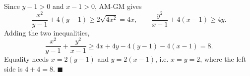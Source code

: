 Since $y-1>0$ and $x-1>0$, AM-GM gives
\[\dfrac{x^2}{y-1}+4(y-1)\ge2\sqrt{4x^2}=4x,\qquad \dfrac{y^2}{x-1}+4(x-1)\ge4y.\]
Adding the two inequalities,
\[\dfrac{x^2}{y-1}+\dfrac{y^2}{x-1}\ge4x+4y-4(y-1)-4(x-1)=8.\]
Equality needs $x=2(y-1)$ and $y=2(x-1)$, i.e. $x=y=2$, where the left side is $4+4=8$. $\blacksquare$
